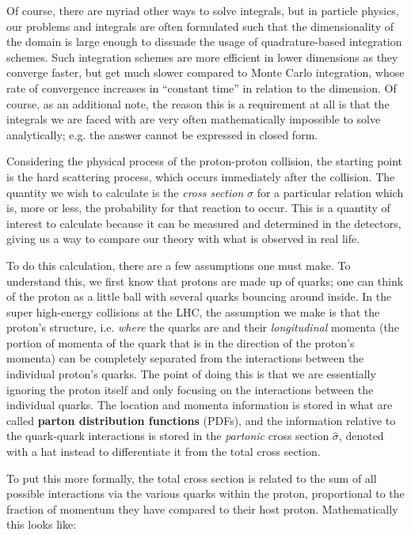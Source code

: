 Of course, there are myriad other ways to solve integrals, but in particle physics, our problems and integrals are often formulated such that the dimensionality of the domain is large enough to dissuade the usage of quadrature-based integration schemes. Such integration schemes are more efficient in lower dimensions as they converge faster, but get much slower compared to Monte Carlo integration, whose rate of convergence increases in ``constant time'' in relation to the dimension. Of course, as an additional note, the reason this is a requirement at all is that the integrals we are faced with are very often mathematically impossible to solve analytically; e.g. the answer cannot be expressed in closed form.

Considering the physical process of the proton-proton collision, the starting point is the hard scattering process, which occurs immediately after the collision. The quantity we wish to calculate is the \textit{cross section} $\sigma$ for a particular relation which is, more or less, the probability for that reaction to occur. This is a quantity of interest to calculate because it can be measured and determined in the detectors, giving us a way to compare our theory with what is observed in real life.

To do this calculation, there are a few assumptions one must make. To understand this, we first know that protons are made up of quarks; one can think of the proton as a little ball with several quarks bouncing around inside. In the super high-energy collisions at the LHC, the assumption we make is that the proton's structure, i.e. \textit{where} the quarks are and their \textit{longitudinal} momenta (the portion of momenta of the quark that is in the direction of the proton's momenta) can be completely separated from the interactions between the individual proton's quarks. The point of doing this is that we are essentially ignoring the proton itself and only focusing on the interactions between the individual quarks. The location and momenta information is stored in what are called \textbf{parton distribution functions} (PDFs), and the information relative to the quark-quark interactions is stored in the \textit{partonic} cross section $\hat{\sigma}$, denoted with a hat instead to differentiate it from the total cross section.

To put this more formally, the total cross section is related to the sum of all possible interactions via the various quarks within the proton, proportional to the fraction of momentum they have compared to their host proton. Mathematically this looks like:

